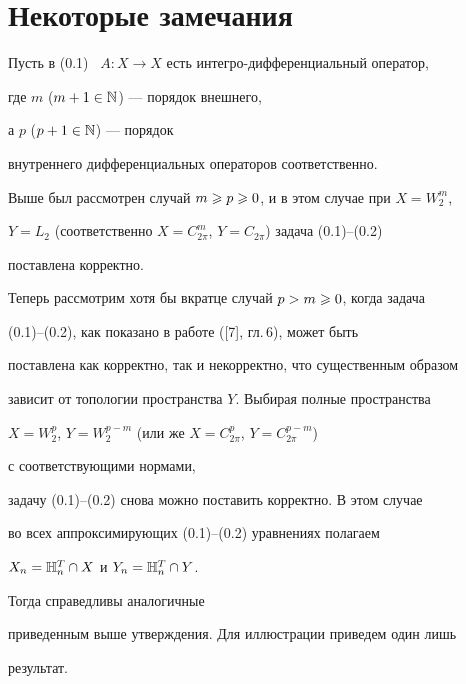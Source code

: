 \section{Некоторые замечания}





Пусть в (0.1) \ $A:X\to X$ есть интегро-дифференциальный оператор,


где $m$ ($m+1\in\Bbb N$) --- порядок внешнего,


а $p$ ($p+1\in\Bbb N$) --- порядок


внутреннего дифференциальных операторов соответственно.


Выше был рассмотрен случай $m\geqslant p\geqslant 0$, и в этом случае при $X=W^m_2$,


$Y=L_2$ (соответственно $X=C^m_{2\pi}$, $Y=C_{2\pi}$) задача (0.1)--(0.2)


поставлена корректно.





Теперь рассмотрим хотя бы вкратце случай $p>m\geqslant0$, когда задача


(0.1)--(0.2), как показано в работе ([7], гл.\,6), может быть


поставлена как корректно, так и некорректно, что существенным образом


зависит от топологии пространства $Y$. Выбирая полные пространства


$X=W^p_2$, $Y=W^{p-m}_2$ (или же $X=C^p_{2\pi}$, $Y=C^{p-m}_{2\pi}$)


с соответствующими нормами,


задачу (0.1)--(0.2) снова можно поставить корректно. В этом случае


во всех аппроксимирующих (0.1)--(0.2) уравнениях полагаем


$X_n=\Bbb H^T_n\cap X$ и $Y_n=\Bbb H^T_n\cap Y$.


Тогда справедливы аналогичные


приведенным выше утверждения. Для иллюстрации приведем один лишь


результат.





